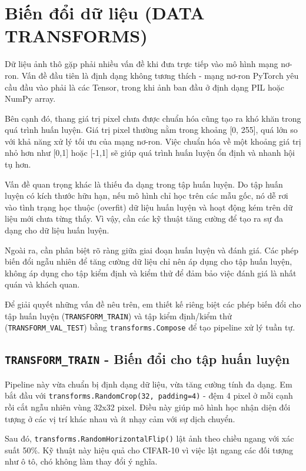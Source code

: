 \documentclass[12pt, a4paper, openany]{report}
\begin{document}
\section{Biến đổi dữ liệu (DATA TRANSFORMS)}
Dữ liệu ảnh thô gặp phải nhiều vấn đề khi đưa trực tiếp vào mô hình mạng nơ-ron. Vấn đề đầu tiên là định dạng không tương thích - mạng nơ-ron PyTorch yêu cầu đầu vào phải là các Tensor, trong khi ảnh ban đầu ở định dạng PIL hoặc NumPy array. 

Bên cạnh đó, thang giá trị pixel chưa được chuẩn hóa cũng tạo ra khó khăn trong quá trình huấn luyện. Giá trị pixel thường nằm trong khoảng [0, 255], quá lớn so với khả năng xử lý tối ưu của mạng nơ-ron. Việc chuẩn hóa về một khoảng giá trị nhỏ hơn như [0,1] hoặc [-1,1] sẽ giúp quá trình huấn luyện ổn định và nhanh hội tụ hơn. 

Vấn đề quan trọng khác là thiếu đa dạng trong tập huấn luyện. Do tập huấn luyện có kích thước hữu hạn, nếu mô hình chỉ học trên các mẫu gốc, nó dễ rơi vào tình trạng học thuộc (overfit) dữ liệu huấn luyện và hoạt động kém trên dữ liệu mới chưa từng thấy. Vì vậy, cần các kỹ thuật tăng cường để tạo ra sự đa dạng cho dữ liệu huấn luyện. 

Ngoài ra, cần phân biệt rõ ràng giữa giai đoạn huấn luyện và đánh giá. Các phép biến đổi ngẫu nhiên để tăng cường dữ liệu chỉ nên áp dụng cho tập huấn luyện, không áp dụng cho tập kiểm định và kiểm thử để đảm bảo việc đánh giá là nhất quán và khách quan.

Để giải quyết những vấn đề nêu trên, em thiết kế riêng biệt các phép biến đổi cho tập huấn luyện (\texttt{TRANSFORM\_TRAIN}) và tập kiểm định/kiểm thử (\texttt{TRANSFORM\_VAL\_TEST}) bằng \texttt{transforms.Compose} để tạo pipeline xử lý tuần tự.

\subsection{\texttt{TRANSFORM\_TRAIN} - Biến đổi cho tập huấn luyện}
Pipeline này vừa chuẩn bị định dạng dữ liệu, vừa tăng cường tính đa dạng. Em bắt đầu với \texttt{transforms.RandomCrop(32, padding=4)} - đệm 4 pixel ở mỗi cạnh rồi cắt ngẫu nhiên vùng 32x32 pixel. Điều này giúp mô hình học nhận diện đối tượng ở các vị trí khác nhau và ít nhạy cảm với sự dịch chuyển.

Sau đó, \texttt{transforms.RandomHorizontalFlip()} lật ảnh theo chiều ngang với xác suất 50\%. Kỹ thuật này hiệu quả cho CIFAR-10 vì việc lật ngang các đối tượng như ô tô, chó không làm thay đổi ý nghĩa. 
\end{document}
